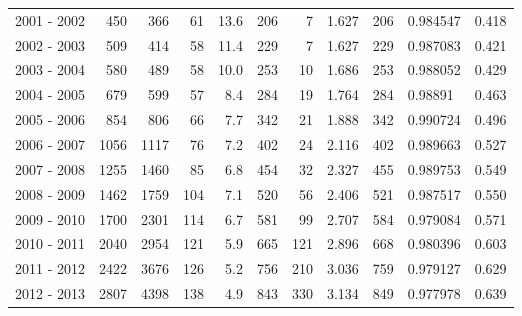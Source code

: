 \begin{tabular}{lrrrrrrrllr}
2001 - 2002 &      450 &      366 &                61 &              13.6 &                     206 &                          7 &       1.627 &           206 &   0.984547 &             0.418 \\
2002 - 2003 &      509 &      414 &                58 &              11.4 &                     229 &                          7 &       1.627 &           229 &   0.987083 &             0.421 \\
2003 - 2004 &      580 &      489 &                58 &              10.0 &                     253 &                         10 &       1.686 &           253 &   0.988052 &             0.429 \\
2004 - 2005 &      679 &      599 &                57 &               8.4 &                     284 &                         19 &       1.764 &           284 &    0.98891 &             0.463 \\
2005 - 2006 &      854 &      806 &                66 &               7.7 &                     342 &                         21 &       1.888 &           342 &   0.990724 &             0.496 \\
2006 - 2007 &     1056 &     1117 &                76 &               7.2 &                     402 &                         24 &       2.116 &           402 &   0.989663 &             0.527 \\
2007 - 2008 &     1255 &     1460 &                85 &               6.8 &                     454 &                         32 &       2.327 &           455 &   0.989753 &             0.549 \\
2008 - 2009 &     1462 &     1759 &               104 &               7.1 &                     520 &                         56 &       2.406 &           521 &   0.987517 &             0.550 \\
2009 - 2010 &     1700 &     2301 &               114 &               6.7 &                     581 &                         99 &       2.707 &           584 &   0.979084 &             0.571 \\
2010 - 2011 &     2040 &     2954 &               121 &               5.9 &                     665 &                        121 &       2.896 &           668 &   0.980396 &             0.603 \\
2011 - 2012 &     2422 &     3676 &               126 &               5.2 &                     756 &                        210 &       3.036 &           759 &   0.979127 &             0.629 \\
2012 - 2013 &     2807 &     4398 &               138 &               4.9 &                     843 &                        330 &       3.134 &           849 &   0.977978 &             0.639 \\

\end{tabular}
